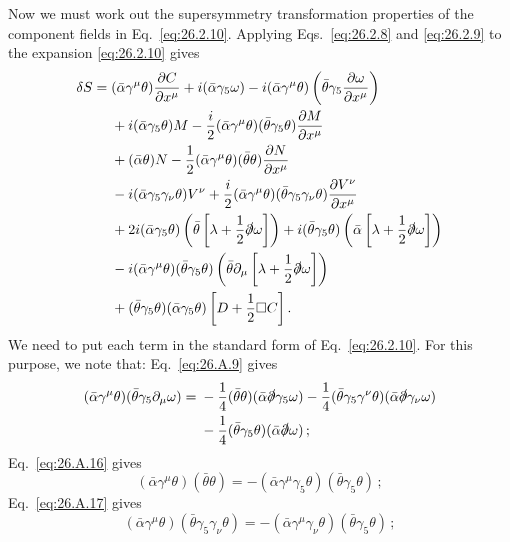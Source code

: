 Now we must work out the supersymmetry transformation properties of the
component fields in Eq.~\eqref{eq:26.2.10}. Applying Eqs.~\eqref{eq:26.2.8}
and \eqref{eq:26.2.9} to the expansion \eqref{eq:26.2.10} gives
\[
  \begin{aligned}
  \delta S={}&(\bar\alpha\gamma^\mu\theta)\frac{\partial C}{\partial x^\mu}
  +i(\bar\alpha\gamma_5\omega)
  -i(\bar\alpha\gamma^\mu\theta)
    \left(\bar\theta\gamma_5\frac{\partial\omega}{\partial x^\mu}\right)\\
  &+i(\bar\alpha\gamma_5\theta)M
  -\frac{i}{2}(\bar\alpha\gamma^\mu\theta)(\bar\theta\gamma_5\theta)
    \frac{\partial M}{\partial x^\mu}\\
  &+(\bar\alpha\theta)N
  -\frac{1}{2}(\bar\alpha\gamma^\mu\theta)(\bar\theta\theta)
    \frac{\partial N}{\partial x^\mu}\\
  &-i(\bar\alpha\gamma_5\gamma_\nu\theta)V^\nu
  +\frac{i}{2}(\bar\alpha\gamma^\mu\theta)
    (\bar\theta\gamma_5\gamma_\nu\theta)
    \frac{\partial V^\nu}{\partial x^\mu}\\
  &+2i(\bar\alpha\gamma_5\theta)
    \left(\bar\theta\left[\lambda+\frac{1}{2}\sl{\partial}\omega\right]\right)
  +i(\bar\theta\gamma_5\theta)
    \left(\bar\alpha\left[\lambda+\frac{1}{2}\sl{\partial}\omega\right]\right)\\
  &-i(\bar\alpha\gamma^\mu\theta)(\bar\theta\gamma_5\theta)
    \left(\bar\theta\partial_\mu
      \left[\lambda+\frac{1}{2}\sl{\partial}\omega\right]\right)\\
  &+(\bar\theta\gamma_5\theta)(\bar\alpha\gamma_5\theta)
    \left[D+\frac{1}{2}\Box C\right].
  \end{aligned}
\]
We need to put each term in the standard form of Eq.~\eqref{eq:26.2.10}. For
this purpose, we note that: Eq.~\eqref{eq:26.A.9} gives
\[
  \begin{aligned}
  (\bar\alpha\gamma^\mu\theta)(\bar\theta\gamma_5\partial_\mu\omega)
  ={}&-\frac14(\bar\theta\theta)
    (\bar\alpha\sl{\partial}\gamma_5\omega)
  -\frac14(\bar\theta\gamma_5\gamma^\nu\theta)
    (\bar\alpha\sl{\partial}\gamma_\nu\omega)\\
  &-\frac14(\bar\theta\gamma_5\theta)
    (\bar\alpha\sl{\partial}\omega)\,;
  \end{aligned}
\]
Eq.~\eqref{eq:26.A.16} gives
\[
  (\bar\alpha\gamma^\mu\theta)(\bar\theta\theta)
  =-(\bar\alpha\gamma^\mu\gamma_5\theta)
    (\bar\theta\gamma_5\theta)\,;
\]
Eq.~\eqref{eq:26.A.17} gives
\[
  (\bar\alpha\gamma^\mu\theta)(\bar\theta\gamma_5\gamma_\nu\theta)
  =-(\bar\alpha\gamma^\mu\gamma_\nu\theta)
    (\bar\theta\gamma_5\theta)\,;
\]
